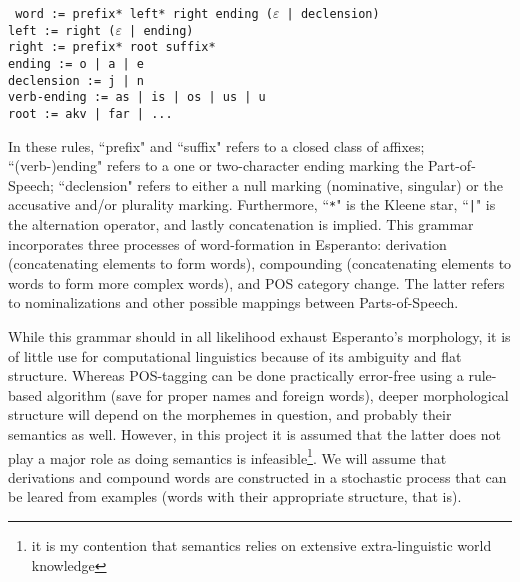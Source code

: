 \documentclass[10pt,a4paper]{article}
\begin{document}
\texttt{
word := prefix* left* right ending ($\varepsilon$ | declension) \\
left := right ($\varepsilon$ | ending) \\
right := prefix* root suffix* \\
ending := o | a | e \\
declension := j | n \\
verb-ending := as | is | os | us | u \\
root := akv | far | ...
}

In these rules, ``prefix" and ``suffix" refers to a closed class of affixes;
``(verb-)ending" refers to a one or two-character ending marking the
Part-of-Speech; ``declension" refers to either a null marking (nominative,
singular) or the accusative and/or plurality marking. Furthermore,
``\texttt{*}" is the Kleene star, ``\texttt{|}" is the alternation operator,
and lastly concatenation is implied. This grammar incorporates three processes
of word-formation in Esperanto: derivation (concatenating elements to form
words), compounding (concatenating elements to words to form more complex
words), and POS category change.  The latter refers to nominalizations and
other possible mappings between Parts-of-Speech.

While this grammar should in all likelihood exhaust Esperanto's morphology, 
it is of little use for computational linguistics because of its ambiguity
and flat structure.  Whereas POS-tagging can be done practically error-free
using a rule-based algorithm (save for proper names and foreign words), deeper
morphological structure will depend on the morphemes in question, and probably
their semantics as well. However, in this project it is assumed that the latter
does not play a major role as doing semantics is infeasible\footnote{it is my
contention that semantics relies on extensive extra-linguistic world
knowledge}. We will assume that derivations and compound words are constructed
in a stochastic process that can be leared from examples (words with their
appropriate structure, that is).
\end{document}
